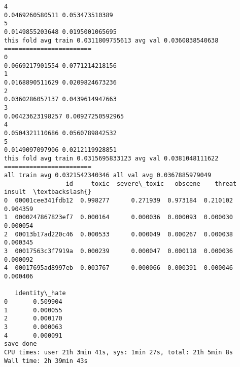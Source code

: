 \documentclass[11pt]{article}
\begin{document}
\begin{Verbatim}[commandchars=\\\{\}]
4
0.0469260580511 0.053473510389
5
0.0149855203648 0.0195001065695
this fold avg train 0.0311809755613 avg val 0.0360838540638
========================
0
0.0669217901554 0.0771214218156
1
0.0168890511629 0.0209824673236
2
0.0360286057137 0.0439614947663
3
0.00423623198257 0.00927250592965
4
0.0504321110686 0.0560789842532
5
0.0149097097906 0.0212119928851
this fold avg train 0.0315695833123 avg val 0.0381048111622
========================
all train avg 0.0321542340346 all val avg 0.0367885979049
                 id     toxic  severe\_toxic   obscene    threat    insult  \textbackslash{}
0  00001cee341fdb12  0.998277      0.271939  0.973184  0.210102  0.904359   
1  0000247867823ef7  0.000164      0.000036  0.000093  0.000030  0.000054   
2  00013b17ad220c46  0.000533      0.000049  0.000267  0.000038  0.000345   
3  00017563c3f7919a  0.000239      0.000047  0.000118  0.000036  0.000092   
4  00017695ad8997eb  0.003767      0.000066  0.000391  0.000046  0.000406   

   identity\_hate  
0       0.509904  
1       0.000055  
2       0.000170  
3       0.000063  
4       0.000091  
save done
CPU times: user 21h 3min 41s, sys: 1min 27s, total: 21h 5min 8s
Wall time: 2h 39min 43s

    \end{Verbatim}


    
    
    
    
\end{document}

